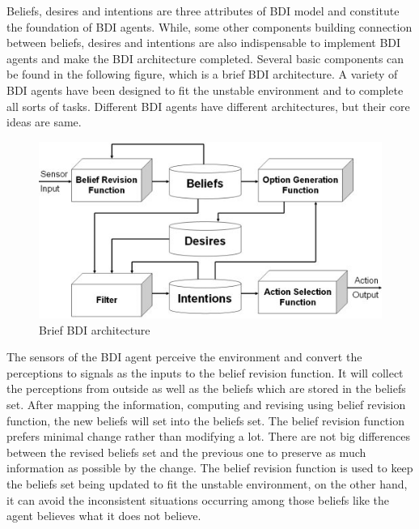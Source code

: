 Beliefs, desires and intentions are three attributes of BDI model and constitute the foundation of BDI agents. While, some other components building connection between beliefs, desires and intentions are also indispensable to implement BDI agents and make the BDI architecture completed.
Several basic components can be found in the following figure, which is a brief BDI architecture. A variety of BDI agents have been designed to fit the unstable environment and to complete all sorts of tasks. Different BDI agents have different architectures, but their core ideas are same.

\begin{figure}[htbp]
  \centering
  \includegraphics[width=\textwidth]{images/BDIAr}
  \caption{Brief BDI architecture \cite{BDIA}}%
  \label{fig:Brief BDI architecture}
\end{figure}

The sensors of the BDI agent perceive the environment and convert the perceptions to signals as the inputs to the belief revision function. It will collect the perceptions from outside as well as the beliefs which are stored in the beliefs set. After mapping the information, computing and revising using belief revision function, the new beliefs will set into the beliefs set. The belief revision function prefers minimal change rather than modifying a lot. There are not big differences between the revised beliefs set and the previous one to preserve as much information as possible by the change\cite{Antje_SpatialBelief_2011}. The belief revision function is used to keep the beliefs set being updated to fit the unstable environment, on the other hand, it can avoid the inconsistent situations occurring among those beliefs like the agent believes what it does not believe.

